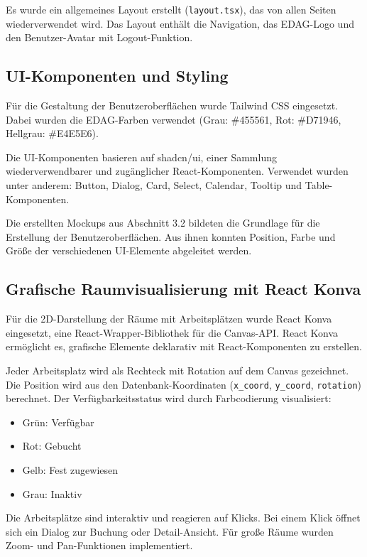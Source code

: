 \documentclass[11pt,a4paper]{report}
\begin{document}
Es wurde ein allgemeines Layout erstellt (\texttt{layout.tsx}), das von allen Seiten wiederverwendet wird. Das Layout enthält die Navigation, das EDAG-Logo und den Benutzer-Avatar mit Logout-Funktion.

\subsection{UI-Komponenten und Styling}

Für die Gestaltung der Benutzeroberflächen wurde Tailwind CSS eingesetzt. Dabei wurden die EDAG-Farben verwendet (Grau: \#455561, Rot: \#D71946, Hellgrau: \#E4E5E6).

Die UI-Komponenten basieren auf shadcn/ui, einer Sammlung wiederverwendbarer und zugänglicher React-Komponenten. Verwendet wurden unter anderem: Button, Dialog, Card, Select, Calendar, Tooltip und Table-Komponenten.

Die erstellten Mockups aus Abschnitt 3.2 bildeten die Grundlage für die Erstellung der Benutzeroberflächen. Aus ihnen konnten Position, Farbe und Größe der verschiedenen UI-Elemente abgeleitet werden.

\subsection{Grafische Raumvisualisierung mit React Konva}

Für die 2D-Darstellung der Räume mit Arbeitsplätzen wurde React Konva eingesetzt, eine React-Wrapper-Bibliothek für die Canvas-API. React Konva ermöglicht es, grafische Elemente deklarativ mit React-Komponenten zu erstellen.

Jeder Arbeitsplatz wird als Rechteck mit Rotation auf dem Canvas gezeichnet. Die Position wird aus den Datenbank-Koordinaten (\texttt{x\_coord}, \texttt{y\_coord}, \texttt{rotation}) berechnet. Der Verfügbarkeitsstatus wird durch Farbcodierung visualisiert:

\begin{itemize}
    \item Grün: Verfügbar
    \item Rot: Gebucht
    \item Gelb: Fest zugewiesen
    \item Grau: Inaktiv
\end{itemize}

Die Arbeitsplätze sind interaktiv und reagieren auf Klicks. Bei einem Klick öffnet sich ein Dialog zur Buchung oder Detail-Ansicht. Für große Räume wurden Zoom- und Pan-Funktionen implementiert.
\end{document}
